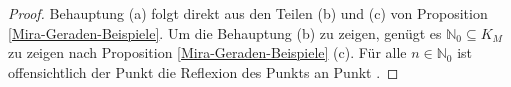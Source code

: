 \begin{proof}
    Behauptung (a) folgt direkt aus den Teilen (b) und (c) von Proposition \ref{Mira-Geraden-Beispiele}.
    Um die Behauptung (b) zu zeigen, genügt es $\mathbb{N}_0 \subseteq K_M$ zu zeigen nach Proposition \ref{Mira-Geraden-Beispiele} (c).
    Für alle $n \in \mathbb{N}_0$ ist offensichtlich der Punkt  die Reflexion des Punkts  an Punkt . 

\end{proof}
